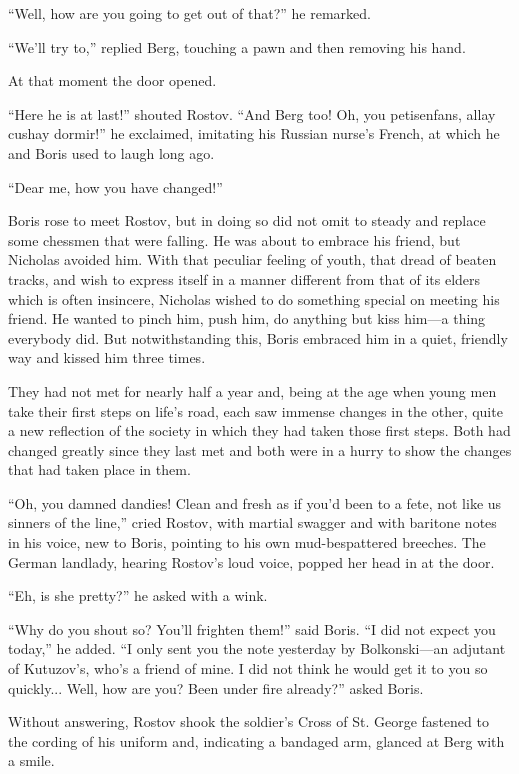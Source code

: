 ``Well, how are you going to get out of that?'' he remarked.

``We'll try to,'' replied Berg, touching a pawn and then removing
his hand.

At that moment the door opened.

``Here he is at last!'' shouted Rostov. ``And Berg too! Oh, you
petisenfans, allay cushay dormir!'' he exclaimed, imitating his
Russian nurse's French, at which he and Boris used to laugh long
ago.

``Dear me, how you have changed!''

Boris rose to meet Rostov, but in doing so did not omit to steady
and replace some chessmen that were falling. He was about to
embrace his friend, but Nicholas avoided him. With that peculiar
feeling of youth, that dread of beaten tracks, and wish to
express itself in a manner different from that of its elders
which is often insincere, Nicholas wished to do something special
on meeting his friend. He wanted to pinch him, push him, do
anything but kiss him---a thing everybody did. But
notwithstanding this, Boris embraced him in a quiet, friendly way
and kissed him three times.

They had not met for nearly half a year and, being at the age
when young men take their first steps on life's road, each saw
immense changes in the other, quite a new reflection of the
society in which they had taken those first steps. Both had
changed greatly since they last met and both were in a hurry to
show the changes that had taken place in them.

``Oh, you damned dandies! Clean and fresh as if you'd been to a
fete, not like us sinners of the line,'' cried Rostov, with
martial swagger and with baritone notes in his voice, new to
Boris, pointing to his own mud-bespattered breeches. The German
landlady, hearing Rostov's loud voice, popped her head in at the
door.

``Eh, is she pretty?'' he asked with a wink.

``Why do you shout so? You'll frighten them!'' said Boris. ``I
did not expect you today,'' he added. ``I only sent you the note
yesterday by Bolkonski---an adjutant of Kutuzov's, who's a friend
of mine. I did not think he would get it to you so
quickly... Well, how are you? Been under fire already?'' asked
Boris.

Without answering, Rostov shook the soldier's Cross of St. George
fastened to the cording of his uniform and, indicating a bandaged
arm, glanced at Berg with a smile.

